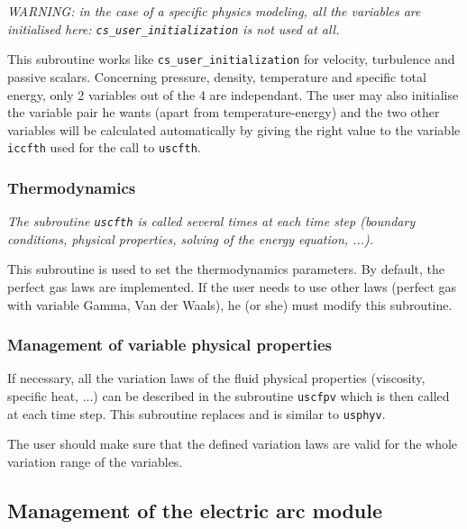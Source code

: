 {{{{\em WARNING: in the case of a specific physics modeling, all the
variables are initialised here: {\em \texttt{cs\_user\_initialization}} is not used at
all.}

This subroutine works like \texttt{cs\_user\_initialization} for velocity,
turbulence and passive scalars. Concerning pressure, density,
temperature and specific total energy, only 2 variables out of the 4 are
independant. The user may also initialise the variable pair he wants
(apart from temperature-energy) and the two other variables will be
calculated automatically by giving the right value to the variable
\texttt{iccfth} used for the call to \texttt{uscfth}.

\subsubsection{Thermodynamics}

\noindent
\textit{The subroutine \texttt{uscfth} is called several times at each time step
 (boundary conditions, physical properties, solving of the energy equation, ...).}

This subroutine is used to set the thermodynamics parameters. By
default, the perfect gas laws are implemented. If the user needs to use
other laws (perfect gas with variable Gamma, Van der Waals), he (or she) must
modify this subroutine.

\subsubsection{Management of variable physical properties}

If necessary, all the variation laws of the fluid physical properties
(viscosity, specific heat, ...) can be described in the subroutine \texttt{uscfpv}
 which is then called at each time step. This subroutine replaces and is similar to \texttt{usphyv}.

The user should make sure that the defined variation laws are valid for
the whole variation range of the variables.

\subsection{Management of the electric arc module}
}}}
